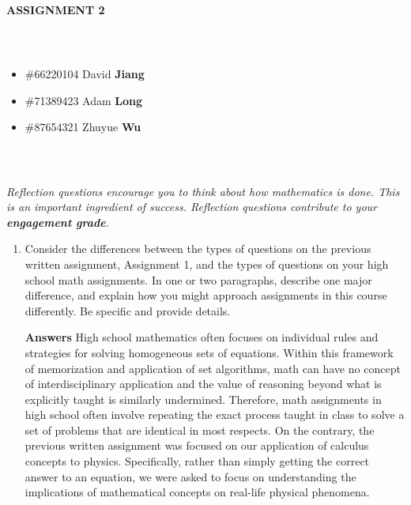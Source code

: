 \documentclass{article}
\begin{document}
\large{\textbf{ASSIGNMENT 2}}

\normalsize

\

\begin{tabular*}{6.5in}{c}
\hline
\end{tabular*}



\begin{itemize}
    \item \#66220104 David {\bf Jiang} 
    \item \#71389423 Adam {\bf Long}
    \item \#87654321 Zhuyue {\bf Wu}
\end{itemize}

\begin{tabular*}{6.5in}{c}
\hline
\end{tabular*}

\ 

\textit{Reflection questions encourage you to think about how mathematics is done. This is an important ingredient of success. Reflection questions contribute to your \textbf{engagement grade}.}

\begin{enumerate}[leftmargin=*] 

\item Consider the differences between the types of questions on the previous written assignment, Assignment 1, and the types of questions on your high school math assignments. In one or two paragraphs, describe one major difference, and explain how you might approach assignments in this course differently. Be specific and provide details.

\color{blue}
\textbf{Answers} \newline 
High school mathematics often focuses on individual rules and strategies for solving homogeneous sets of equations. Within this framework of memorization and application of set algorithms, math can have no concept of interdisciplinary application and the value of reasoning beyond what is explicitly taught is similarly undermined. Therefore, math assignments in high school often involve repeating the exact process taught in class to solve a set of problems that are identical in most respects. On the contrary, the previous written assignment was focused on our application of calculus concepts to physics. Specifically, rather than simply getting the correct answer to an equation, we were asked to focus on understanding the implications of mathematical concepts on real-life physical phenomena. 
\color{black}


\end{enumerate}
\end{document}
